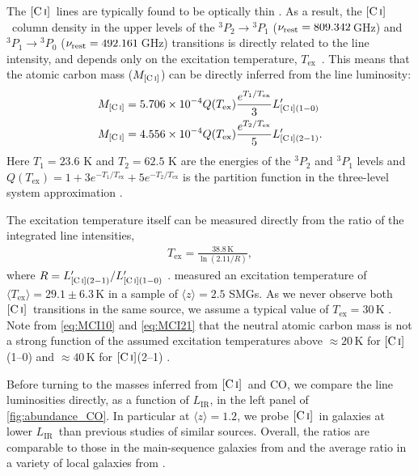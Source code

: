 \documentclass[twocolumn]{aastex62}
\newcommand{\LIR}{\ensuremath{L_{\mathrm{IR}}}}
\newcommand{\MCI}{\ensuremath{M_{\mathrm{\CI}}}}
\newcommand{\Tex}{\ensuremath{T_{\mathrm{ex}}}}
\newcommand{\avg}[1]{\ensuremath{\langle #1 \rangle}}
\newcommand{\CI}{\ensuremath{\mathrm{[C\, \textsc{i}]}}}
\begin{document}
The \CI\ lines are typically found to be optically thin \citep{Ojha2001,
  Ikeda2002, Weiss2003}.  As a result, the \CI\ column density in the upper
levels of the ${^{3}P_{2}} \rightarrow {^{3}P_{1}}$
($\nu_{\rm rest} = 809.342$\,GHz) and ${^{3}P_{1}} \rightarrow {^{3}P_{0}}$
($\nu_{\rm rest} = 492.161$\,GHz) transitions is directly related to the line
intensity, and depends only on the excitation temperature, \Tex\
\citep[e.g.,][given their low critical densities,
$< 10^{3}$\,cm$^{-3}$]{Frerking1989, Stutzki1997, Weiss2003}.  This means that
the atomic carbon mass (\MCI) can be directly inferred from the line
luminosity:
\begin{align}
\MCI &= 5.706 \times 10^{-4} Q(\Tex)\frac{e^{T_1 / \Tex}}{3}L'_{\CI(1-0)} \label{eq:MCI10}\\
\MCI &= 4.556 \times 10^{-4} Q(\Tex)\frac{e^{T_2 / \Tex}}{5}L'_{\CI(2-1)}. \label{eq:MCI21}
\end{align}
Here $T_1 = 23.6$ K and $T_2 = 62.5$ K are the energies of the ${^{3}P_{2}}$
and ${^{3}P_{1}}$ levels and
\(Q(\Tex) = 1 + 3 e^{-T_1/\Tex} + 5 e^{-T_2/\Tex}\) is the partition function
in the three-level system approximation \citep{Weiss2003, Weiss2005a}.

The excitation temperature itself can be measured directly from the ratio of
the integrated line intensities,
\begin{align}
  \label{eq:CI_Tex}
  \Tex = \frac{\mathrm{38.8\, K}}{\ln(2.11 / R)},
\end{align}
where $R = L'_{\CI(2-1)}/L'_{\CI(1-0)}$ \citep{Stutzki1997}.  \cite{Walter2011}
measured an excitation temperature of $\langle \Tex \rangle = 29.1 \pm 6.3$\,K
in a sample of $\langle z \rangle = 2.5$ SMGs.  As we never observe both \CI\
transitions in the same source, we assume a typical value of $\Tex = 30$\,K
\citep[cf.][corresponding to $R = 0.58$]{Weiss2005a, Bothwell2017,
  Popping2017, Valentino2018, Brisbin2019}.  Note from \autoref{eq:MCI10} and
\autoref{eq:MCI21} that the neutral atomic carbon mass is not a strong function
of the assumed excitation temperatures above $\approx 20$\,K for \CI(1--0) and
$\approx 40$\,K for \CI(2--1) \citep[as pointed out by][]{Weiss2005a}.

Before turning to the masses inferred from \CI\ and CO, we compare the line
luminosities directly, as a function of \LIR, in the left panel of
\autoref{fig:abundance_CO}.  In particular at $\avg{z}=1.2$, we probe \CI\ in
galaxies at lower \LIR\ than previous studies of similar sources.  Overall, the
ratios are comparable to those in the main-sequence galaxies from
\cite{Valentino2018} and the average ratio in a variety of local galaxies from
\cite{Gerin2000}.
\end{document}
